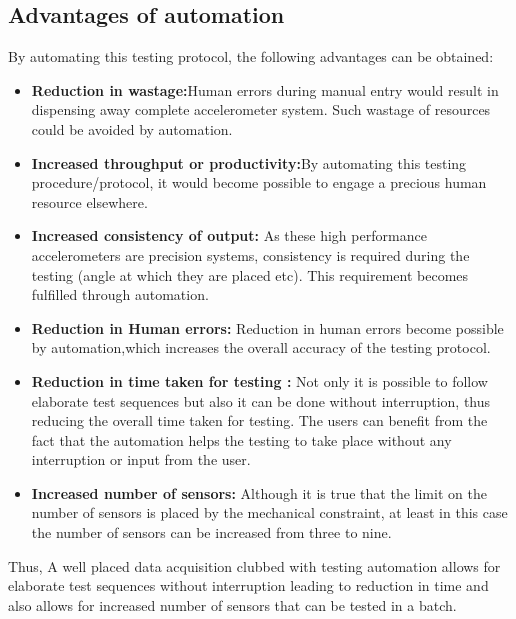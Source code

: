 \documentclass{FR16}
\begin{document}
\subsection{Advantages of automation}
By automating this testing protocol, the  following advantages can  be obtained:
\begin{itemize}
    \item \textbf{Reduction in wastage:}Human errors during manual entry would result in dispensing away complete accelerometer system. Such wastage of resources could be avoided by automation. 
    \item \textbf{Increased throughput or productivity:}By automating this testing procedure/protocol, it would become possible to engage a precious human resource elsewhere.
    \item \textbf{Increased consistency of output:} As these high performance accelerometers are precision systems, consistency is required during the testing (angle at which they are placed etc). This requirement becomes fulfilled through automation. 
    \item \textbf{Reduction in Human errors:} Reduction in human errors become possible by automation,which increases the overall accuracy of the testing protocol.
    \item \textbf{Reduction in time taken for testing :} Not only it is possible to follow elaborate test sequences but also it can be done without interruption, thus reducing the overall time taken for testing. The users can benefit from the fact that the automation helps the testing to take place without any interruption or input from the user.
    \item \textbf{Increased number of sensors:} Although it is true that the limit on the number of sensors is placed by the mechanical constraint, at least in this case the number of sensors can be increased from three to nine.
\end{itemize}
Thus, A well placed data acquisition clubbed with testing automation allows for elaborate test sequences without interruption leading to reduction in time and also allows for increased number of sensors that can be tested in a batch.
\end{document}
